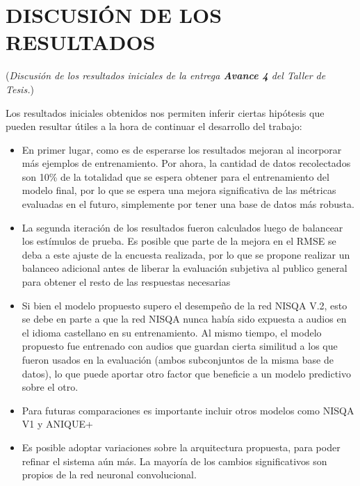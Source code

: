 \newpage
\section{DISCUSIÓN DE LOS RESULTADOS}
(\color{red}\textit{Discusión de los resultados iniciales de la entrega \textbf{Avance 4} del Taller de Tesis.})\color{black}

Los resultados iniciales obtenidos nos permiten inferir ciertas hipótesis que pueden resultar útiles a la hora de continuar el desarrollo del trabajo:

\begin{itemize}
    \item En primer lugar, como es de esperarse los resultados mejoran al incorporar más ejemplos de entrenamiento. Por ahora, la cantidad de datos recolectados son 10\% de la totalidad que se espera obtener para el entrenamiento del modelo final, por lo que se espera una mejora significativa de las métricas evaluadas en el futuro, simplemente por tener una base de datos más robusta.
    \item La segunda iteración de los resultados fueron calculados luego de balancear los estímulos de prueba. Es posible que parte de la mejora en el RMSE se deba a este ajuste de la encuesta realizada, por lo que se propone realizar un balanceo adicional antes de liberar la evaluación subjetiva al publico general para obtener el resto de las respuestas necesarias
    \item Si bien el modelo propuesto supero el desempeño de la red NISQA V.2, esto se debe en parte a que la red NISQA nunca había sido expuesta a audios en el idioma castellano en su entrenamiento. Al mismo tiempo, el modelo propuesto fue entrenado con audios que guardan cierta similitud a los que fueron usados en la evaluación (ambos subconjuntos de la misma base de datos), lo que puede aportar otro factor que beneficie a un modelo predictivo sobre el otro.
    \item Para futuras comparaciones es importante incluir otros modelos como NISQA V1 y ANIQUE+
    \item Es posible adoptar variaciones sobre la arquitectura propuesta, para poder refinar el sistema aún más. La mayoría de los cambios significativos son propios de la red neuronal convolucional.
\end{itemize}


\newpage